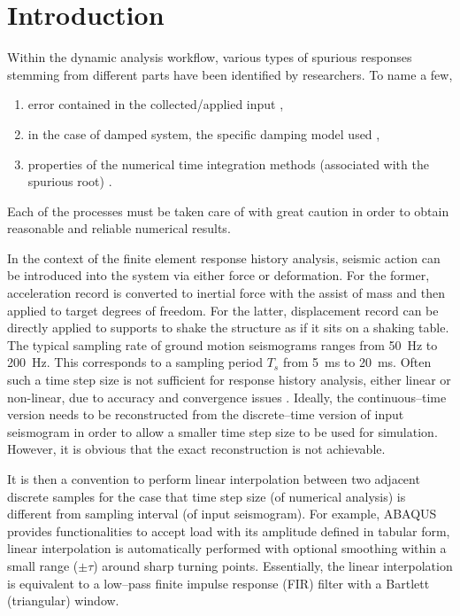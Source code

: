 \section{Introduction}
Within the dynamic analysis workflow, various types of spurious responses stemming from different parts have been identified by researchers. To name a few,
\begin{enumerate}
\item error contained in the collected/applied input \citep{Shing1987},
\item in the case of damped system, the specific damping model used \citep{Chopra2015},
\item properties of the numerical time integration methods (associated with the spurious root) \citep{Hulbert1994}.
\end{enumerate}
Each of the processes must be taken care of with great caution in order to obtain reasonable and reliable numerical results.

In the context of the finite element response history analysis, seismic action can be introduced into the system via either force or deformation. For the former, acceleration record is converted to inertial force with the assist of mass and then applied to target degrees of freedom. For the latter, displacement record can be directly applied to supports to shake the structure as if it sits on a shaking table.
The typical sampling rate of ground motion seismograms ranges from \SI{50}{\hertz} to \SI{200}{\hertz}. This corresponds to a sampling period $T_s$ from \SI{5}{\milli\second} to \SI{20}{\milli\second}. Often such a time step size is not sufficient for response history analysis, either linear or non-linear, due to accuracy and convergence issues \citep[see, e.g.,][]{Rossi2014}. Ideally, the continuous--time version needs to be reconstructed from the discrete--time version of input seismogram in order to allow a smaller time step size to be used for simulation. However, it is obvious that the exact reconstruction is not achievable.

It is then a convention to perform linear interpolation between two adjacent discrete samples for the case that time step size (of numerical analysis) is different from sampling interval (of input seismogram). For example, ABAQUS \citep[see][\S34.1.2]{ABAQUS2014} provides functionalities to accept load with its amplitude defined in tabular form, linear interpolation is automatically performed with optional smoothing within a small range ($\pm\tau$) around sharp turning points. Essentially, the linear interpolation is equivalent to a low--pass finite impulse response (FIR) filter with a Bartlett (triangular) window.

